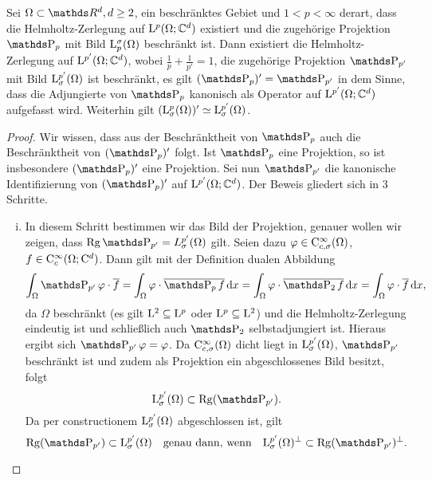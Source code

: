 \begin{prop}
  Sei $\Omega \subset \R^d, d\geq 2$, ein beschränktes Gebiet und $1< p< \infty$ derart, dass die Helmholtz-Zerlegung auf $\mathrm{L}^p(\Omega; \mathbb{C}^d)$ existiert und die zugehörige Projektion $\PP_p$ mit Bild $\mathrm{L}_p^\sigma(\Omega)$ beschränkt ist.
  Dann existiert die Helmholtz-Zerlegung auf $\mathrm{L}^{p'}(\Omega; \mathbb{C}^d)$, wobei $\frac{1}{p} + \frac{1}{p'} = 1$, die zugehörige Projektion $\PP_{p'}$ mit Bild $\mathrm{L}^{p'}_\sigma(\Omega)$ ist beschränkt, es gilt $(\PP_p)' = \PP_{p'}$ in dem Sinne, dass die Adjungierte von $\PP_p$ kanonisch als Operator auf $\mathrm{L}^{p'}(\Omega; \mathbb{C}^d)$ aufgefasst wird.
  Weiterhin gilt $(\mathrm{L}_\sigma^p(\Omega))' \simeq \mathrm{L}_\sigma^{p'}(\Omega)$.
\end{prop}

\begin{proof}
  Wir wissen, dass aus der Beschränktheit von $\PP_p$ auch die Beschränktheit von $(\PP_p)'$ folgt.
  Ist $\PP_p$ eine Projektion, so ist insbesondere $(\PP_p)'$ eine Projektion.
  Sei nun $\PP_{p'}$ die kanonische Identifizierung von $(\PP_p)'$ auf $\mathrm{L}^{p'}(\Omega; \mathbb{C}^d)$.
  Der Beweis gliedert sich in 3 Schritte.
  \begin{enumerate}[(i)]
    \item In diesem Schritt bestimmen wir das Bild der Projektion, genauer wollen wir zeigen, dass $\Rg \PP_{p'} = L_\sigma^{p'}(\Omega)$ gilt.
  Seien dazu $\varphi \in \mathrm{C}_{c, \sigma}^\infty(\Omega)$, $f \in \mathrm{C}_c^\infty(\Omega; \mathrm{C}^d)$.
  Dann gilt mit der Definition dualen Abbildung
  \begin{align*}
    \int_\Omega \PP_{p'}\varphi \cdot \overline f 
    = \int_\Omega \varphi \cdot \overline{\PP_p f} \d x  
    = \int_\Omega \varphi \cdot \overline{\PP_2 f} \d x 
    = \int_\Omega \varphi \cdot \overline{f} \d x,
  \end{align*}
      da $\Omega$ beschränkt (es gilt $\mathrm{L}^2 \subseteq \mathrm{L}^p$ oder $\mathrm{L}^p \subseteq \mathrm{L}^2$) und die Helmholtz-Zerlegung eindeutig ist und schließlich auch $\PP_2$ selbstadjungiert ist.
  Hieraus ergibt sich $\PP_{p'} \varphi = \varphi$.
  Da $\mathrm{C}_{c, \sigma}^\infty(\Omega)$ dicht liegt in $\mathrm{L}^{p'}_\sigma(\Omega)$, $\PP_{p'}$ beschränkt ist und zudem als Projektion ein abgeschlossenes Bild besitzt, folgt
  $$
  \Ell^{p'}_\sigma(\Omega) \subset \Rg(\PP_{p'}).
  $$
  Da per constructionem $\mathrm{L}_\sigma^{p'}(\Omega)$ abgeschlossen ist, gilt
  $$
  \Rg(\PP_{p'}) \subset \Ell_\sigma^{p'}(\Omega)\quad \text{genau dann, wenn}\quad \Ell_\sigma^{p'}(\Omega)^\perp \subset \Rg(\PP_{p'})^\perp.
$$
\end{enumerate}
\end{proof}
